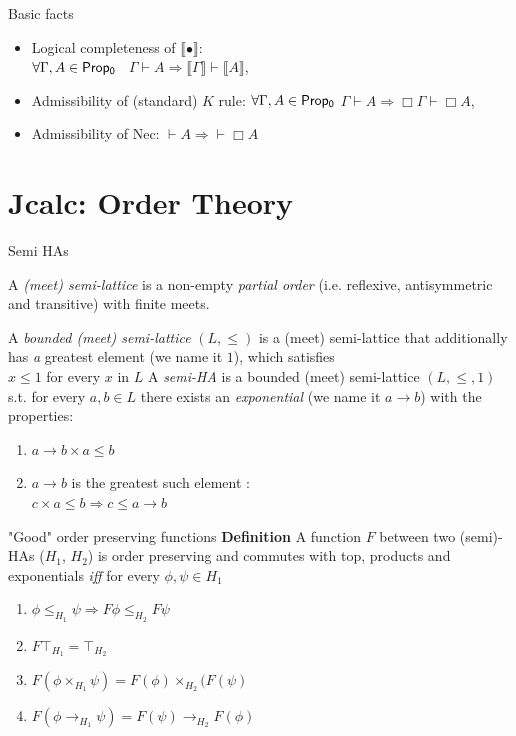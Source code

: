 \documentclass{beamer}
\begin{document}
\begin{frame}{Basic facts}
  \begin{itemize}
\item Logical completeness of $\llbracket\bullet \rrbracket$:\\
 $\forall \Gamma, A \in {\sf Prop_0}$ \ $\Gamma\vdash A \Longrightarrow \llbracket \Gamma\rrbracket\vdash\llbracket A\rrbracket $,
 \item Admissibility of (standard) $K$ rule:
 $\forall \Gamma, A \in {\sf Prop_0}$ $\Gamma\vdash A \Longrightarrow \Box\Gamma\vdash\Box A$,
 \item Admissibility of Nec: 
 $\vdash A  \Longrightarrow \vdash \Box A$
  \end{itemize}
\end{frame}
\section{Jcalc: Order Theory}
\begin{frame}{Semi HAs}
  \begin{outline}
  \1 A \textit{(meet) semi-lattice} is a non-empty \emph{partial order} 
  (i.e. reflexive, antisymmetric and transitive) 
  with finite meets.
  
 \1
  A \textit{bounded (meet) semi-lattice} $(L,\le)$ is a (meet) 
  semi-lattice that additionally has 
  \2 \emph a {greatest element} (we name it $1$), which satisfies\\
  $x \le 1$ for every $x$ in $L$  
 \1 A \textit{semi-HA} is a bounded (meet) semi-lattice $(L,\le, 1)$ 
 s.t. for every $a,b\in L$ there exists an \textit{exponential} 
 (we name it $a\rightarrow b$) 
 with the properties: 
 \begin{enumerate}
 \item $a\rightarrow b\times a\le b $
 \item $a\rightarrow b$ is the greatest such element : \\ $c\times a\le b \Longrightarrow c\le a\rightarrow b $
 \end{enumerate}
  \end{outline}
\end{frame}
\begin{frame}{"Good" order preserving functions}
  \textbf{Definition}
  A function $F$ between two (semi)-HAs ($H_1$, $H_2$)
   is order preserving
  and commutes with top, products and exponentials \emph{iff} for every 
  $\phi,\psi \in H_1$
    \begin{enumerate}
    \item $\phi\le_{H_1}\psi\Rightarrow F\phi\le_{H_2}F\psi$
    \item $F\top_{H_1} = \top_{H_2}$ 
    \item{$F(\phi \times_{H_1}\psi) = F(\phi)\times_{H_2}(F(\psi)$} 
    \item $F(\phi\rightarrow_{H_1} \psi) = F(\psi)\rightarrow_{H_2} F(\phi)$
    \end{enumerate}    
  \end{frame}
\end{document}
